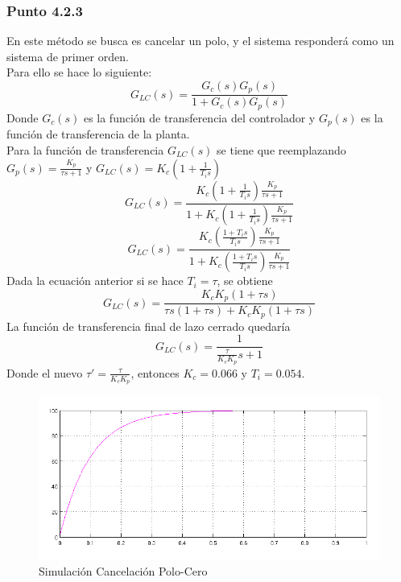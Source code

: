 \documentclass[twocolumn]{IEEEtran}
\begin{document}
\subsubsection{Punto 4.2.3}
\noindent
En este método se busca es cancelar un polo, y el sistema responderá como un sistema de primer orden.\\
Para ello se hace lo siguiente:
\begin{equation}
 G_{LC} \left( s \right) = \frac{{G_c \left( s \right)G_p \left( s \right)}}{{1 + G_c \left( s \right)G_p \left( s \right)}}
\label{ecu104}
\end{equation}
\noindent
Donde $G_c(s)$ es la función de transferencia del controlador y $G_p(s)$ es la función de transferencia de la planta.\\
Para la función de transferencia $G_{LC}(s)$ se tiene que reemplazando $G_p(s)=\frac{K_p}{\tau s + 1}$ y $G_{LC}(s)=K_c \left( {1 + \frac{1}{{T_i s}}} \right)$
\begin{equation}
 G_{LC} \left( s \right) = \frac{{K_c \left( {1 + \frac{1}{{T_i s}}} \right)\frac{{K_p }}{{\tau s + 1}}}}{{1 + K_c \left( {1 + \frac{1}{{T_i s}}} \right)\frac{{K_p }}{{\tau s + 1}}}}
\label{ecu105}
\end{equation}
\begin{equation}
 G_{LC} \left( s \right) = \frac{{K_c \left( {\frac{{1 + T_i s}}{{T_i s}}} \right)\frac{{K_p }}{{\tau s + 1}}}}{{1 + K_c \left( {\frac{{1 + T_i s}}{{T_i s}}} \right)\frac{{K_p }}{{\tau s + 1}}}}
\label{ecu106}
\end{equation}
\noindent
Dada la ecuación anterior si se hace $T_i=\tau$, se obtiene
\begin{equation}
 G_{LC} \left( s \right) = \frac{{K_c K_p \left( {1 + \tau s} \right)}}{{\tau s\left( {1 + \tau s} \right) + K_c K_p \left( {1 + \tau s} \right)}}
\label{ecu107}
\end{equation}
\noindent
La función de transferencia final de lazo cerrado quedaría
\begin{equation}
 G_{LC} \left( s \right) = \frac{1}{{\frac{\tau }{{K_c K_p }}s + 1}}
\label{ecu108}
\end{equation}
\noindent
Donde el nuevo $\tau '=\frac{\tau }{K_c K_p }$, entonces $K_c = 0.066$ y $T_i = 0.054$.\\
\begin{figure}[H]
	\centering
		\includegraphics[scale=0.4]{salida32.png}
	\caption{Simulación Cancelación Polo-Cero}
	\label{fig6}
\end{figure}
\end{document}
